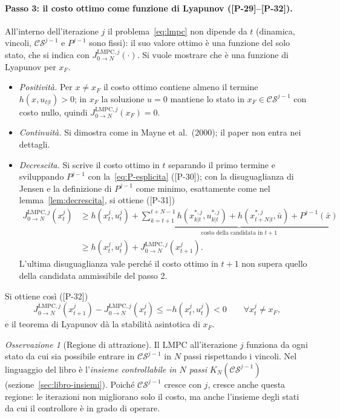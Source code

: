 \documentclass[11pt,a4paper]{article}
\theoremstyle{definition}
\theoremstyle{plain}
\theoremstyle{remark}
\newtheorem{osservazione}[definizione]{Osservazione}
\newcommand{\CS}{\mathcal{CS}}
\newcommand{\JL}{J^{\mathrm{LMPC},j}_{0\to N}}
\newcommand{\eqp}[1]{\textup{[P-#1]}}   %
\begin{document}
\paragraph{Passo 3: il costo ottimo come funzione di Lyapunov (\eqp{29}--\eqp{32}).}
All'interno dell'iterazione $j$ il problema~\eqref{eq:lmpc} non dipende da
$t$ (dinamica, vincoli, $\CS^{j-1}$ e $P^{j-1}$ sono fissi): il suo valore ottimo
è una funzione del solo stato, che si indica con $\JL(\cdot)$. Si vuole
mostrare che è una funzione di Lyapunov per $x_F$.

\begin{itemize}
  \item \emph{Positività.} Per $x\ne x_F$ il costo ottimo contiene almeno il
        termine $h(x,u_{t|t})>0$; in $x_F$ la soluzione $u=0$ mantiene lo
        stato in $x_F\in\CS^{j-1}$ con costo nullo, quindi $\JL(x_F)=0$.
  \item \emph{Continuità.} Si dimostra come in Mayne et al.~(2000); il paper
        non entra nei dettagli.
  \item \emph{Decrescita.} Si scrive il costo ottimo in $t$ separando il primo
        termine e sviluppando $P^{j-1}$ con la~\eqref{eq:P-esplicita}
        (\eqp{30}); con la disuguaglianza di Jensen e la definizione di
        $P^{j-1}$ come minimo, esattamente come nel lemma~\ref{lem:decrescita},
        si ottiene (\eqp{31})
        \[
        \begin{aligned}
          \JL(x^j_t) &\ge h(x^j_t,u^j_t)
          + \underbrace{\sum_{k=t+1}^{t+N-1}h(x^{*,j}_{k|t},u^{*,j}_{k|t})
          + h(x^{*,j}_{t+N|t},\bar u) + P^{j-1}(\bar x)}_{\text{costo della candidata in } t+1}\\
          &\ge h(x^j_t,u^j_t) + \JL(x^j_{t+1}).
        \end{aligned}
        \]
        L'ultima disuguaglianza vale perché il costo ottimo in $t+1$ non supera
        quello della candidata ammissibile del passo 2.
\end{itemize}
Si ottiene così (\eqp{32})
\begin{equation}\label{eq:lyapunov-lmpc}
  \JL(x^j_{t+1}) - \JL(x^j_t) \le -h(x^j_t,u^j_t) < 0
  \qquad \forall x^j_t\ne x_F,
\end{equation}
e il teorema di Lyapunov dà la stabilità asintotica di $x_F$.

\begin{osservazione}[Regione di attrazione]
Il LMPC all'iterazione $j$ funziona da ogni stato da cui sia possibile entrare
in $\CS^{j-1}$ in $N$ passi rispettando i vincoli. Nel linguaggio del libro è
l'\emph{insieme controllabile in $N$ passi} $K_N(\CS^{j-1})$
(sezione~\ref{sec:libro-insiemi}). Poiché $\CS^{j-1}$ cresce con
$j$, cresce anche questa regione: le iterazioni non migliorano solo il costo,
ma anche l'insieme degli stati da cui il controllore è in grado di operare.
\end{osservazione}
\end{document}
